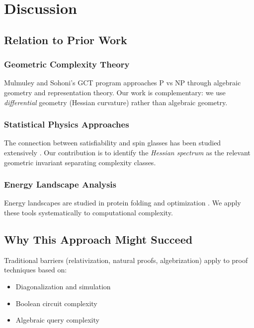 \documentclass[11pt,a4paper]{article}
\theoremstyle{plain}
\theoremstyle{definition}
\theoremstyle{remark}
\begin{document}
\section{Discussion}

\subsection{Relation to Prior Work}

\subsubsection{Geometric Complexity Theory}
Mulmuley and Sohoni's GCT program \cite{mulmuley2001} approaches P vs NP through algebraic geometry and representation theory. Our work is complementary: we use \emph{differential} geometry (Hessian curvature) rather than algebraic geometry.

\subsubsection{Statistical Physics Approaches}
The connection between satisfiability and spin glasses has been studied extensively \cite{mezard2002,krzakala2007}. Our contribution is to identify the \emph{Hessian spectrum} as the relevant geometric invariant separating complexity classes.

\subsubsection{Energy Landscape Analysis}
Energy landscapes are studied in protein folding \cite{wales2003} and optimization \cite{ballard2017}. We apply these tools systematically to computational complexity.

\subsection{Why This Approach Might Succeed}

Traditional barriers (relativization, natural proofs, algebrization) apply to proof techniques based on:
\begin{itemize}
    \item Diagonalization and simulation
    \item Boolean circuit complexity
    \item Algebraic query complexity
\end{itemize}
\end{document}
